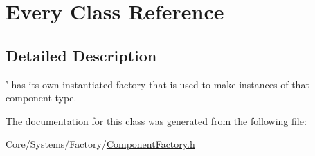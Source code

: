 \hypertarget{classEvery}{\section{Every Class Reference}
\label{classEvery}
}


\subsection{Detailed Description}
' has its own instantiated factory that is used to make instances of that component type. 

The documentation for this class was generated from the following file\-:\begin{DoxyCompactItemize}
\item 
Core/\-Systems/\-Factory/\hyperlink{ComponentFactory_8h}{Component\-Factory.\-h}\end{DoxyCompactItemize}
